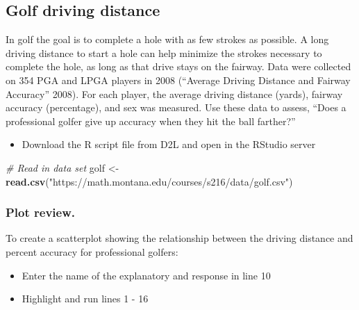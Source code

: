 \documentclass[
]{report}
\newenvironment{Shaded}{\begin{snugshade}}{\end{snugshade}}
\newcommand{\CommentTok}[1]{\textcolor[rgb]{0.56,0.35,0.01}{\textit{#1}}}
\newcommand{\FunctionTok}[1]{\textcolor[rgb]{0.13,0.29,0.53}{\textbf{#1}}}
\newcommand{\NormalTok}[1]{#1}
\newcommand{\OtherTok}[1]{\textcolor[rgb]{0.56,0.35,0.01}{#1}}
\newcommand{\StringTok}[1]{\textcolor[rgb]{0.31,0.60,0.02}{#1}}
\providecommand{\tightlist}{%
  \setlength{\itemsep}{0pt}\setlength{\parskip}{0pt}}
\begin{document}
\subsection{Golf driving distance}\label{golf-driving-distance}

In golf the goal is to complete a hole with as few strokes as possible. A long driving distance to start a hole can help minimize the strokes necessary to complete the hole, as long as that drive stays on the fairway. Data were collected on 354 PGA and LPGA players in 2008 ({``Average Driving Distance and Fairway Accuracy''} 2008). For each player, the average driving distance (yards), fairway accuracy (percentage), and sex was measured. Use these data to assess, ``Does a professional golfer give up accuracy when they hit the ball farther?''

\begin{itemize}
\tightlist
\item
  Download the R script file from D2L and open in the RStudio server
\end{itemize}

\begin{Shaded}
\begin{Highlighting}[]
\CommentTok{\# Read in data set}
\NormalTok{golf }\OtherTok{\textless{}{-}} \FunctionTok{read.csv}\NormalTok{(}\StringTok{"https://math.montana.edu/courses/s216/data/golf.csv"}\NormalTok{)}
\end{Highlighting}
\end{Shaded}

\subsubsection*{Plot review.}\label{plot-review.}

To create a scatterplot showing the relationship between the driving distance and percent accuracy for professional golfers:

\begin{itemize}
\item
  Enter the name of the explanatory and response in line 10
\item
  Highlight and run lines 1 - 16
\end{itemize}
\end{document}
